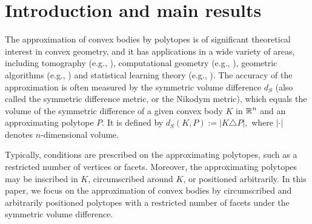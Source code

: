 \section{Introduction and main results}

The approximation of convex bodies by polytopes is of significant theoretical interest in convex geometry, and it has applications in a wide variety of areas, including tomography (e.g., \cite{gardner1995geometric}), computational geometry (e.g., \cite{edelsbrunner,edelsbrunnermesh}), geometric algorithms (e.g., \cite{GKM}) and statistical learning theory (e.g., \cite{diakonikolas2016learning}). The accuracy of the approximation  is often measured by the symmetric volume difference $d_S$ (also called the symmetric difference metric, or the Nikodym metric), which equals the volume of the symmetric difference of a given convex body $K$ in $\operatorname{\mathbb{R}}^n$ and an approximating polytope $P$. It is defined by
$d_S(K,P) := |K\triangle P|,$ where $|\cdot|$ denotes $n$-dimensional volume. 

Typically, conditions are prescribed on the approximating polytopes, such as a restricted number of vertices or facets. Moreover, the approximating polytopes may be inscribed in $K$, circumscribed around $K$, or positioned arbitrarily. In this paper, we focus on the approximation of convex bodies by circumscribed and arbitrarily positioned polytopes with a restricted number of facets under the symmetric volume difference. 

